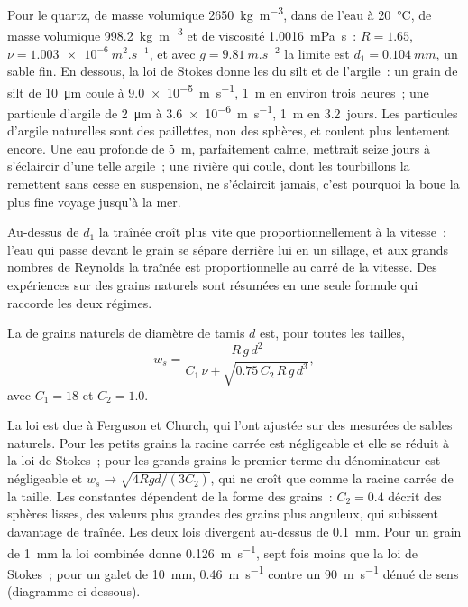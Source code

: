 Pour le quartz, de masse volumique \qty{2650}{kg.m^{-3}}, dans de l'eau à \qty{20}{\celsius},
de masse volumique \qty{998.2}{kg.m^{-3}} et de viscosité \qty{1.0016}{mPa.s}~: $R =
1.65$, $\nu = \qty{1.003e-6}{m^2.s^{-1}}$, et avec $g =
\qty{9.81}{m.s^{-2}}$ la limite est $d_1 = \qty{0.104}{mm}$, un sable fin. En dessous,
la loi de Stokes donne les  du silt et de l'argile~: un grain de silt
de \qty{10}{\micro m} coule à \qty{9.0e-5}{m.s^{-1}}, \qty{1}{m} en environ
trois heures~; une particule d'argile de \qty{2}{\micro m} à
\qty{3.6e-6}{m.s^{-1}}, \qty{1}{m} en \num{3.2}~jours. Les particules d'argile naturelles sont
des paillettes, non des sphères, et coulent plus lentement encore. Une eau profonde de \qty{5}{m}, parfaitement
calme, mettrait seize jours à s'éclaircir d'une telle argile~; une rivière qui coule, dont les
tourbillons la remettent sans cesse en suspension, ne s'éclaircit jamais, c'est pourquoi la boue la plus fine voyage
jusqu'à la mer.

Au-dessus de $d_1$ la traînée croît plus vite que proportionnellement à la vitesse~: l'eau
qui passe devant le grain se sépare derrière lui en un sillage, et aux grands nombres de Reynolds
la traînée est proportionnelle au carré de la vitesse. Des expériences sur
des grains naturels sont résumées en une seule formule qui raccorde les deux régimes.

\begin{proposition}\label{prop:b1:erosion-transport:combined}
La  de grains naturels de diamètre de tamis $d$ est, pour toutes les
tailles,
\[
  w_s = \frac{R\,g\,d^2}{C_1\,\nu + \sqrt{0.75\,C_2\,R\,g\,d^3}},
\]
avec $C_1 = 18$ et $C_2 = 1.0$.
\end{proposition}
\admitted

La loi est due à Ferguson et Church, qui l'ont ajustée sur des 
mesurées de sables naturels. Pour les petits grains la racine carrée est
négligeable et elle se réduit à la loi de Stokes~; pour les grands grains le premier terme du
dénominateur est négligeable et $w_s \to \sqrt{4 R g d/(3 C_2)}$, qui ne croît
que comme la racine carrée de la taille. Les constantes dépendent de la forme des
grains~: $C_2 = 0.4$ décrit des sphères lisses, des valeurs plus grandes des grains plus
anguleux, qui subissent davantage de traînée. Les deux lois divergent au-dessus de
\qty{0.1}{mm}. Pour un grain de \qty{1}{mm} la loi combinée donne
\qty{0.126}{m.s^{-1}}, sept fois moins que la loi de Stokes~; pour un galet de
\qty{10}{mm}, \qty{0.46}{m.s^{-1}} contre un \qty{90}{m.s^{-1}} dénué de sens
(diagramme ci-dessous).


